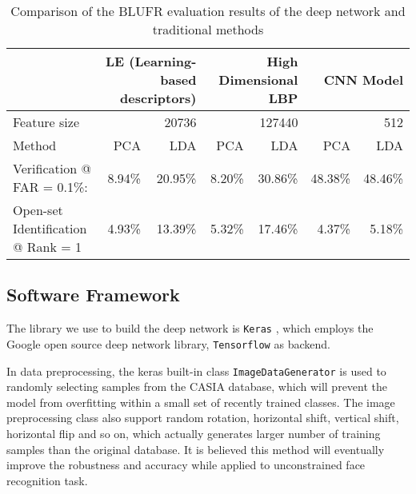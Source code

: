 \documentclass[conference]{IEEEtran}
\begin{document}
\setlength\extrarowheight{3pt}
\begin{table*}[!ht]
	\centering
	\caption{Comparison of the BLUFR evaluation results of the deep network and traditional methods}
	\label{eval_result}
	\begin{tabular}{|l|r|r|r|r|r|r|}
		\hline
		& \multicolumn{2}{r|}{LE (Learning-based descriptors)} & \multicolumn{2}{r|}{High Dimensional LBP} & \multicolumn{2}{r|}{CNN Model} \\ \hline
		Feature size                       & \multicolumn{2}{r|}{20736}                           & \multicolumn{2}{r|}{127440}               & \multicolumn{2}{r|}{512}        \\ \hline
		Method                             & PCA                      & LDA                       & PCA                 & LDA                 & PCA             & LDA            \\ \hline
		Verification @ FAR = 0.1\%:        & 8.94\%                   & 20.95\%                   & 8.20\%              & 30.86\%             & 48.38\%         & 48.46\%        \\ \hline
		Open-set Identification @ Rank = 1 & 4.93\%                   & 13.39\%                   & 5.32\%              & 17.46\%             & 4.37\%          & 5.18\%         \\ \hline
	\end{tabular}
\end{table*}

\subsection{Software Framework}

The library we use to build the deep network is \texttt{Keras} \cite{chollet2015keras}, which employs the Google open source deep network library, \texttt{Tensorflow} \cite{abadi2016tensorflow} as backend. 

In data preprocessing, the keras built-in class \texttt{ImageDataGenerator} is used to randomly selecting samples from the CASIA database, which will prevent the model from overfitting within a small set of recently trained classes. The image preprocessing class also support random rotation, horizontal shift, vertical shift, horizontal flip and so on, which actually generates larger number of training samples than the original database. It is believed this method will eventually improve the robustness and accuracy while applied to unconstrained face recognition task.
\end{document}
